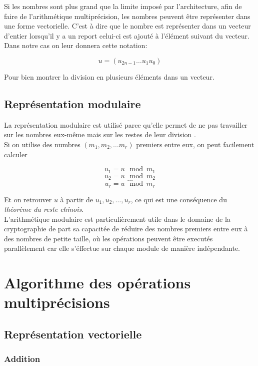 \documentclass[letterpaper]{article}
\begin{document}
Si les nombres sont plus grand que la limite imposé par l'architecture, afin de
faire de l'arithmétique multiprécision, les nombres peuvent être représenter
dans une forme vectorielle. C'est à dire que le nombre est représenter dans un
vecteur d'entier lorsqu'il y a un report celui-ci est ajouté à l'élément
suivant du vecteur.\\

Dans notre cas on leur donnera cette notation:

  $$u = (u_{2n-1} \dots u_1 u_0)$$

Pour bien montrer la division en plusieurs éléments dans un vecteur.


\subsection{Représentation modulaire}

La représentation modulaire est utilisé parce qu'elle permet de ne pas
travailler sur les nombres eux-même mais sur les restes de leur division
\cite{wikiamodulaire}.\\

Si on utilise des numbres $(m_1, m_2, \dots m_r)$ premiers entre eux,
on peut facilement calculer

  $$u_1 = u \mod m_1$$
  $$u_2 = u \mod m_2$$
  $$\dots$$
  $$u_r = u \mod m_r$$

Et on retrouver $u$ à partir de $u_1, u_2, \dots, u_r$, ce qui
est une conséquence du \emph{théorème du reste chinois}.\\

L'arithmétique modulaire est particulièrement utile dans le domaine de la
cryptographie de part sa capacitée de réduire des nombres premiers entre eux à
des nombres de petite taille, où les opérations peuvent être executés
parallèlement car elle s'éffectue sur chaque module de manière indépendante.

\section{Algorithme des opérations multiprécisions}

\subsection{Représentation vectorielle}

\subsubsection{Addition}
\end{document}
